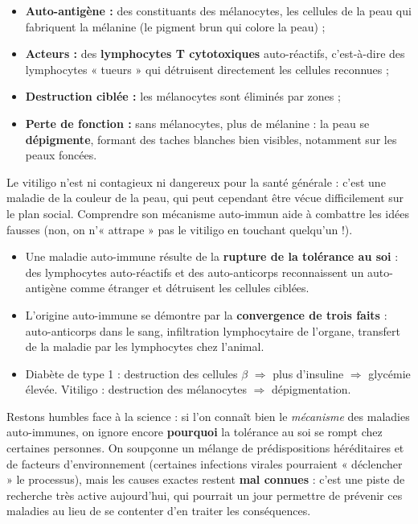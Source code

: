 \documentclass[11pt]{article}
\newcommand{\cle}[1]{{\popxbold\color{popdark}#1}}
\newcounter{popsec}
\newcounter{popsub}
\newcommand{\courssub}[1]{%
  \stepcounter{popsub}%
  \par\vspace{9pt}\noindent{\popxbold\fontsize{11.5}{13}\selectfont\color{popink}{\color{poporange}\thepopsec.\thepopsub}\hspace{6pt}#1}\par\nopagebreak\vspace{4pt}
}
\begin{document}
\begin{itemize}
\item \textbf{Auto-antigène :} des constituants des \cle{mélanocytes}, les cellules de la peau qui fabriquent la mélanine (le pigment brun qui colore la peau) ;
\item \textbf{Acteurs :} des \textbf{lymphocytes T cytotoxiques} auto-réactifs, c'est-à-dire des lymphocytes « tueurs » qui détruisent directement les cellules reconnues ;
\item \textbf{Destruction ciblée :} les mélanocytes sont éliminés par zones ;
\item \textbf{Perte de fonction :} sans mélanocytes, plus de mélanine : la peau se \textbf{dépigmente}, formant des taches blanches bien visibles, notamment sur les peaux foncées.
\end{itemize}

Le vitiligo n'est ni contagieux ni dangereux pour la santé générale : c'est une maladie de la couleur de la peau, qui peut cependant être vécue difficilement sur le plan social. Comprendre son mécanisme auto-immun aide à combattre les idées fausses (non, on n'« attrape » pas le vitiligo en touchant quelqu'un !).

\courssub{Les limites de nos connaissances}

\begin{aretenir}
\begin{itemize}
\item Une maladie auto-immune résulte de la \textbf{rupture de la tolérance au soi} : des lymphocytes auto-réactifs et des auto-anticorps reconnaissent un auto-antigène comme étranger et détruisent les cellules ciblées.
\item L'origine auto-immune se démontre par la \textbf{convergence de trois faits} : auto-anticorps dans le sang, infiltration lymphocytaire de l'organe, transfert de la maladie par les lymphocytes chez l'animal.
\item Diabète de type 1 : destruction des cellules $\beta$ $\Rightarrow$ plus d'insuline $\Rightarrow$ glycémie élevée. Vitiligo : destruction des mélanocytes $\Rightarrow$ dépigmentation.
\end{itemize}
\end{aretenir}

Restons humbles face à la science : si l'on connaît bien le \emph{mécanisme} des maladies auto-immunes, on ignore encore \textbf{pourquoi} la tolérance au soi se rompt chez certaines personnes. On soupçonne un mélange de prédispositions héréditaires et de facteurs d'environnement (certaines infections virales pourraient « déclencher » le processus), mais les causes exactes restent \textbf{mal connues} : c'est une piste de recherche très active aujourd'hui, qui pourrait un jour permettre de prévenir ces maladies au lieu de se contenter d'en traiter les conséquences.
\end{document}
